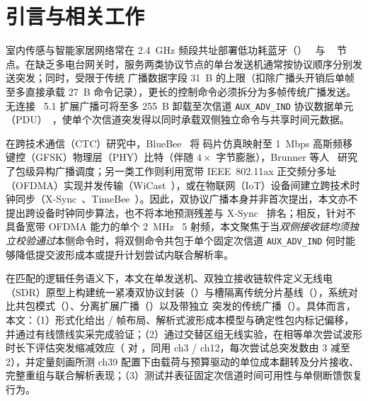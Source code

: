 \section{引言与相关工作}\label{sec:intro}

室内传感与智能家居网络常在 \SI{2.4}{GHz} 频段共址部署低功耗蓝牙（\ble{}）~\cite{bluetooth_core51} 与 \stdfour{}~\cite{ieee802154_2020} 节点。在缺乏多电台网关时，服务两类协议节点的单台发送机通常按协议顺序分别发送突发；同时，受限于传统 \ble{} 广播数据字段 \SI{31}{B} 的上限（扣除广播头开销后单帧至多直接承载 \SI{27}{B} 命令记录），更长的控制命令必须拆分为多帧传统广播发送。无连接 \ble{}~5.1 扩展广播可将至多 \SI{255}{B} 卸载至次信道 \texttt{AUX\_ADV\_IND} 协议数据单元（PDU）~\cite{bluetooth_core51}，使单个次信道突发得以同时承载双侧独立命令与共享时间元数据。

在跨技术通信（CTC）研究中，BlueBee~\cite{jiang2017bluebee} 将 \stdfour{} 码片仿真映射至 \SI{1}{Mbps} \ble{} 高斯频移键控（GFSK）物理层（PHY）比特（伴随 $4\times$ 字节膨胀），Brunner 等人~\cite{brunner2021leveraging} 研究了包级异构广播调度；另一类工作则利用宽带 IEEE~802.11ax 正交频分多址（OFDMA）实现并发传输（WiCast~\cite{xia2025wicast}），或在物联网（IoT）设备间建立跨技术时钟同步（X-Sync~\cite{hofmann2021xsync}、TimeBee~\cite{gao2023timebee}）。因此，双协议广播本身并非首次提出，本文亦不提出跨设备时钟同步算法，也不将本地预测残差与 X-Sync~\cite{hofmann2021xsync} 排名；相反，针对不具备宽带 OFDMA 能力的单个 \SI{2}{MHz} \ble{}~5 射频，本文聚焦于当\emph{双侧接收链均须独立校验通过}本侧命令时，将双侧命令共包于单个固定次信道 \texttt{AUX\_ADV\_IND} 何时能够降低提交波形成本或提升计划尝试内联合解析率。

在匹配的逻辑任务语义下，本文在单发送机、双独立接收链软件定义无线电（SDR）原型上构建统一紧凑双协议封装（\proto{}）与槽隔离传统分片基线（\fragproto{}），系统对比共包模式（\modejc{}）、分离扩展广播（\modesc{}）以及带独立 \stdfour{} 突发的传统广播（\modelc{}）。具体而言，本文：（1）形式化给出 \proto{}/\fragproto{} 帧布局、解析式波形成本模型与确定性包内标记偏移，并通过有线馈线实采完成验证；（2）通过交替区组无线实验，在相等单次尝试波形时长下评估突发缩减效应（\modejc{} 对 \modesc{}，同用 \ble{} ch3 / \stdfour{} ch12，每次尝试总突发数由 3 减至 2），并定量刻画所测 ch39 \modelc{} 配置下由载荷与预算驱动的单位成本翻转及分片接收、完整重组与联合解析表现；（3）测试并表征固定次信道时间可用性与单侧断馈恢复行为。
